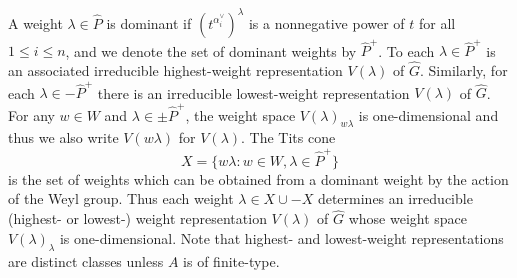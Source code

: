 \documentclass[12pt]{amsart}
\newcommand{\kk}{\Bbbk}%
\DeclareMathOperator{\Hom}{Hom}
\theoremstyle{remark}
\numberwithin{equation}{section}
\begin{document}

A weight $\lambda \in \widehat{P}$ is dominant if $(t^{\alpha_i^\vee})^\lambda$ is a nonnegative power of $t$ for all $1 \leq i \leq n$, and we denote the set of dominant weights by $\widehat{P}^+$. 
To each $\lambda \in \widehat{P}^+$ is an associated irreducible highest-weight representation $V(\lambda)$ of $\widehat{G}$. 
Similarly, for each $\lambda \in -\widehat{P}^+$ there is an irreducible lowest-weight representation $V(\lambda)$ of $\widehat{G}$.
For any $w\in W$ and $\lambda\in\pm\widehat{P}^+$, the weight space $V(\lambda)_{w\lambda}$ is one-dimensional and thus we also write $V(w\lambda)$ for $V(\lambda)$.  
The Tits cone $$X = \{w\lambda : w \in W, \lambda \in \widehat{P}^+\}$$ is the set of weights which can be obtained from a dominant weight by the action of the Weyl group. 
Thus each weight $\lambda\in X \cup -X$ determines an irreducible (highest- or lowest-) weight representation $V(\lambda)$ of $\widehat{G}$ whose weight space $V(\lambda)_\lambda$ is one-dimensional.
Note that highest- and lowest-weight representations are distinct classes unless $A$ is of finite-type.
\end{document}
